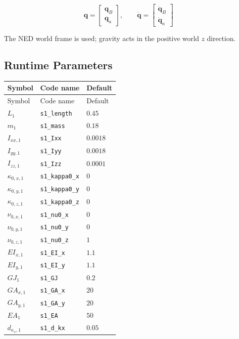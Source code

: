 \documentclass[11pt]{article}
\begin{document}
\begin{equation}
\boldsymbol q=\begin{bmatrix}\boldsymbol q_B\\\boldsymbol q_a\end{bmatrix},\qquad \dot{\boldsymbol q}=\begin{bmatrix}\dot{\boldsymbol q}_B\\\dot{\boldsymbol q}_a\end{bmatrix}
\end{equation}

The NED world frame is used; gravity acts in the positive world $z$ direction.
\subsection{Runtime Parameters}
\begin{longtable}{lll}
\hline
Symbol & Code name & Default \\
\hline
\endfirsthead
\hline Symbol & Code name & Default \\
\hline
\endhead
$L_{1}$ & \texttt{s1\_length} & $0.45$ \\
$m_{1}$ & \texttt{s1\_mass} & $0.18$ \\
$I_{xx,1}$ & \texttt{s1\_Ixx} & $0.0018$ \\
$I_{yy,1}$ & \texttt{s1\_Iyy} & $0.0018$ \\
$I_{zz,1}$ & \texttt{s1\_Izz} & $0.0001$ \\
$\kappa_{0,x,1}$ & \texttt{s1\_kappa0\_x} & $0$ \\
$\kappa_{0,y,1}$ & \texttt{s1\_kappa0\_y} & $0$ \\
$\kappa_{0,z,1}$ & \texttt{s1\_kappa0\_z} & $0$ \\
$\nu_{0,x,1}$ & \texttt{s1\_nu0\_x} & $0$ \\
$\nu_{0,y,1}$ & \texttt{s1\_nu0\_y} & $0$ \\
$\nu_{0,z,1}$ & \texttt{s1\_nu0\_z} & $1$ \\
$EI_{x,1}$ & \texttt{s1\_EI\_x} & $1.1$ \\
$EI_{y,1}$ & \texttt{s1\_EI\_y} & $1.1$ \\
$GJ_{1}$ & \texttt{s1\_GJ} & $0.2$ \\
$GA_{x,1}$ & \texttt{s1\_GA\_x} & $20$ \\
$GA_{y,1}$ & \texttt{s1\_GA\_y} & $20$ \\
$EA_{1}$ & \texttt{s1\_EA} & $50$ \\
$d_{\kappa_x,1}$ & \texttt{s1\_d\_kx} & $0.05$ \\

\end{longtable}
\end{document}
